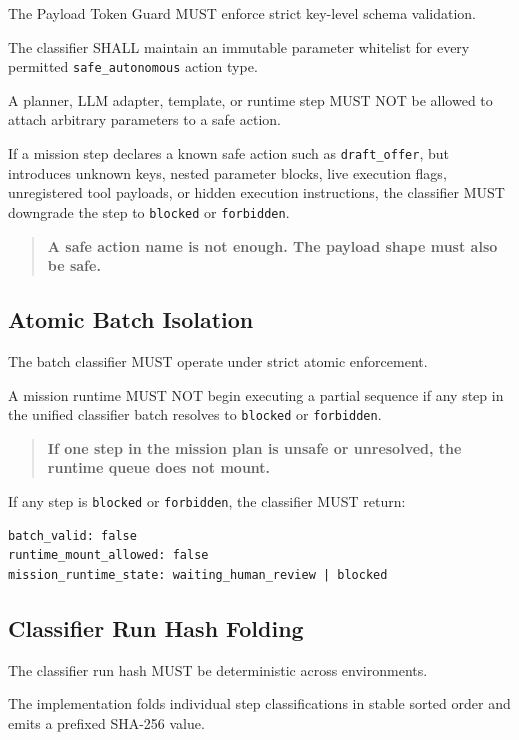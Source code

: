 The Payload Token Guard MUST enforce strict key-level schema validation.

The classifier SHALL maintain an immutable parameter whitelist for every permitted \texttt{safe\_autonomous} action type.

A planner, LLM adapter, template, or runtime step MUST NOT be allowed to attach arbitrary parameters to a safe action.

If a mission step declares a known safe action such as \texttt{draft\_offer}, but introduces unknown keys, nested parameter blocks, live execution flags, unregistered tool payloads, or hidden execution instructions, the classifier MUST downgrade the step to \texttt{blocked} or \texttt{forbidden}.

\begin{quote}
\textbf{A safe action name is not enough. The payload shape must also be safe.}
\end{quote}

\subsection{Atomic Batch Isolation}

The batch classifier MUST operate under strict atomic enforcement.

A mission runtime MUST NOT begin executing a partial sequence if any step in the unified classifier batch resolves to \texttt{blocked} or \texttt{forbidden}.

\begin{quote}
\textbf{If one step in the mission plan is unsafe or unresolved, the runtime queue does not mount.}
\end{quote}

If any step is \texttt{blocked} or \texttt{forbidden}, the classifier MUST return:

\begin{verbatim}
batch_valid: false
runtime_mount_allowed: false
mission_runtime_state: waiting_human_review | blocked
\end{verbatim}

\subsection{Classifier Run Hash Folding}

The classifier run hash MUST be deterministic across environments.

The implementation folds individual step classifications in stable sorted order and emits a prefixed SHA-256 value.

